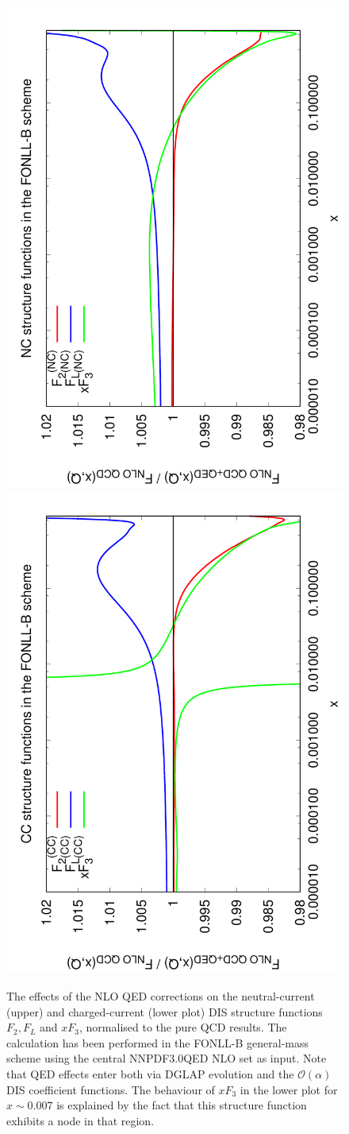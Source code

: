 \begin{figure}[!ht]
\centering
\includegraphics[width=0.7\columnwidth,angle=270]{figs/NLOQEDCorrections_NC.pdf}
\includegraphics[width=0.7\columnwidth,angle=270]{figs/NLOQEDCorrections_CC.pdf}
\caption{The effects of the NLO QED corrections on the neutral-current
(upper) and charged-current (lower plot) DIS structure functions
$F_2, F_L$ and $xF_3$, normalised to the pure QCD results.
%
The calculation has been performed in the FONLL-B general-mass scheme using the
central NNPDF3.0QED NLO
set as input.
%
Note that QED effects enter both via DGLAP evolution and the
$\mathcal{O}(\alpha)$ DIS coefficient functions.
%
The behaviour of $xF_3$ in the lower plot for $x\sim 0.007$ is explained
by the fact that this structure function exhibits a node in that region.
}
\label{fig:StructFuncs}
\end{figure}
